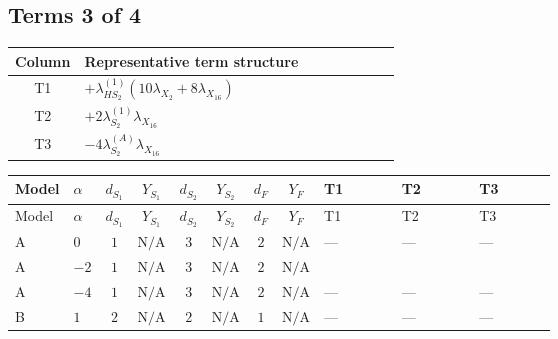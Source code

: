 \documentclass[8pt]{article}
\begin{document}
\begin{landscape}
\subsection*{Terms 3 of 4}
\begin{center}
\begin{tabular}{@{}c >{\raggedright\arraybackslash}p{0.82\linewidth}@{}}
\toprule
Column & Representative term structure \\
\midrule
T1 & \(\displaystyle +{\lambda_{HS_2}^{(1)}} (10 {\lambda_{X_{2}}}+8 {\lambda_{X_{16}}})\) \\
\midrule
T2 & \(\displaystyle +2 {\lambda_{S_2}^{(1)}} {\lambda_{X_{16}}}\) \\
\midrule
T3 & \(\displaystyle -4 {\lambda_{S_2}^{(A)}} {\lambda_{X_{16}}}\) \\
\midrule
\bottomrule
\end{tabular}
\end{center}
\smallskip
\tiny
\begin{longtable}{@{}llcccccc >{\raggedright\arraybackslash}p{0.21\linewidth} >{\raggedright\arraybackslash}p{0.21\linewidth} >{\raggedright\arraybackslash}p{0.21\linewidth}@{}}
\toprule
Model & $\alpha$ & $d_{S_1}$ & $Y_{S_1}$ & $d_{S_2}$ & $Y_{S_2}$ & $d_F$ & $Y_F$ & T1 & T2 & T3 \\
\midrule
\endfirsthead
\toprule
Model & $\alpha$ & $d_{S_1}$ & $Y_{S_1}$ & $d_{S_2}$ & $Y_{S_2}$ & $d_F$ & $Y_F$ & T1 & T2 & T3 \\
\midrule
\endhead
A & $0$ & $1$ & $\text{N/A}$ & $3$ & $\text{N/A}$ & $2$ & $\text{N/A}$ & --- & --- & --- \\
\midrule
A & $-2$ & $1$ & $\text{N/A}$ & $3$ & $\text{N/A}$ & $2$ & $\text{N/A}$ & \scriptsize\adjustbox{max width=\linewidth}{$\begin{gathered} +{\lambda_{HS_2}^{(1)}} (10 {\lambda_{X_{2}}}+8 {\lambda_{X_{16}}})\end{gathered}$} & \scriptsize\adjustbox{max width=\linewidth}{$\begin{gathered} +2 {\lambda_{S_2}^{(1)}} {\lambda_{X_{16}}}\end{gathered}$} & \scriptsize\adjustbox{max width=\linewidth}{$\begin{gathered} -4 {\lambda_{S_2}^{(A)}} {\lambda_{X_{16}}}\end{gathered}$} \\
\midrule
A & $-4$ & $1$ & $\text{N/A}$ & $3$ & $\text{N/A}$ & $2$ & $\text{N/A}$ & --- & --- & --- \\
\midrule
B & $1$ & $2$ & $\text{N/A}$ & $2$ & $\text{N/A}$ & $1$ & $\text{N/A}$ & --- & --- & --- \\

\end{longtable}
\end{landscape}
\end{document}
